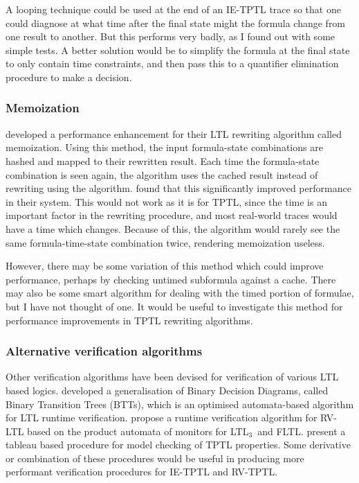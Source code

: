 \documentclass[a4paper]{article}
\newcommand{\ltlt}{LTL$_3$}
\begin{document}
A looping technique could be used at the end of an IE-TPTL trace so that one could diagnose at what time after the final state might the formula change from one result to another. But this performs very badly, as I found out with some simple tests. A better solution would be to simplify the formula at the final state to only contain time constraints, and then pass this to a quantifier elimination procedure to make a decision.

\subsubsection{Memoization}
\textcite[180]{rosu2005rewriting} developed a performance enhancement for their LTL rewriting algorithm called memoization. Using this method, the input formula-state combinations are hashed and mapped to their rewritten result. Each time the formula-state combination is seen again, the algorithm uses the cached result instead of rewriting using the algorithm. \citeauthor{rosu2005rewriting} found that this significantly improved performance in their system. This would not work as it is for TPTL, since the time is an important factor in the rewriting procedure, and most real-world traces would have a time which changes. Because of this, the algorithm would rarely see the same formula-time-state combination twice, rendering memoization useless.

However, there may be some variation of this method which could improve performance, perhaps by checking untimed subformula against a cache. There may also be some smart algorithm for dealing with the timed portion of formulae, but I have not thought of one. It would be useful to investigate this method for performance improvements in TPTL rewriting algorithms.

\subsubsection{Alternative verification algorithms}
Other verification algorithms have been devised for verification of various LTL based logics. \textcite{rosu2005rewriting} developed a generalisation of Binary Decision Diagrams, called Binary Transition Trees (BTTs), which is an optimised automata-based algorithm for LTL runtime verification. \textcite{bauer2010comparing} propose a runtime verification algorithm for RV-LTL based on the product automata of monitors for \ltlt\ and FLTL. \textcite{alur1994really} present a tableau based procedure for model checking of TPTL properties.
Some derivative or combination of these procedures would be useful in producing more performant verification procedures for IE-TPTL and RV-TPTL.
\end{document}
